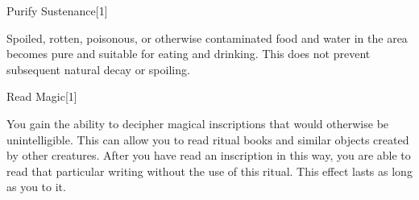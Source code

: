 \begin{spellsection}{Purify Sustenance}[1]
\begin{spellcontent}
\begin{spelltargetinginfo}
\end{spelltargetinginfo}
\begin{spelleffects}
\spelleffect
Spoiled, rotten, poisonous, or otherwise contaminated food and water in the area becomes pure and suitable for eating and drinking.
This does not prevent subsequent natural decay or spoiling.
\end{spelleffects}
\end{spellcontent}
\begin{spellfooter}
\end{spellfooter}
\begin{spellsubcontent}
\end{spellsubcontent}
\end{spellsection}
\begin{spellsection}{Read Magic}[1]
\begin{spellcontent}
\begin{spelltargetinginfo}
\end{spelltargetinginfo}
\begin{spelleffects}
\spelleffect
You gain the ability to decipher magical inscriptions that would otherwise be unintelligible.
This can allow you to read ritual books and similar objects created by other creatures.
After you have read an inscription in this way, you are able to read that particular writing without the use of this ritual.
This effect lasts as long as you  to it.
\end{spelleffects}
\end{spellcontent}
\begin{spellfooter}
\end{spellfooter}
\begin{spellsubcontent}
\end{spellsubcontent}
\end{spellsection}
